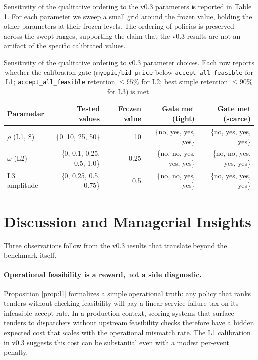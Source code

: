 \documentclass[11pt]{article}
\begin{document}
Sensitivity of the qualitative ordering to the v0.3 parameters is
reported in Table \ref{tab:sensitivity}. For each parameter we sweep a
small grid around the frozen value, holding the other parameters at
their frozen levels. The ordering of policies is preserved across the
swept ranges, supporting the claim that the v0.3 results are not an
artifact of the specific calibrated values.

\begin{table}[t]
\centering
\caption{Sensitivity of the qualitative ordering to v0.3 parameter
choices. Each row reports whether the calibration gate
(\texttt{myopic}/\texttt{bid\_price} below \texttt{accept\_all\_feasible}
for L1; \texttt{accept\_all\_feasible} retention $\leq 95\%$ for L2; best
simple retention $\leq 90\%$ for L3) is met.}
\label{tab:sensitivity}
\small
\begin{tabular}{lrrrr}
\toprule
Parameter & Tested values & Frozen value & Gate met (tight) & Gate met (scarce) \\
\midrule
$\rho$ (L1, \$) & \{0, 10, 25, 50\} & 10 & \{no, yes, yes, yes\} & \{no, yes, yes, yes\} \\
$\omega$ (L2)   & \{0, 0.1, 0.25, 0.5, 1.0\} & 0.25 & \{no, no, yes, yes, yes\} & \{no, no, yes, yes, yes\} \\
L3 amplitude    & \{0, 0.25, 0.5, 0.75\} & 0.5 & \{no, no, yes, yes\} & \{no, yes, yes, yes\} \\
\bottomrule
\end{tabular}
\end{table}

\section{Discussion and Managerial Insights}
\label{sec:discussion}

Three observations follow from the v0.3 results that translate beyond the
benchmark itself.

\paragraph{Operational feasibility is a reward, not a side diagnostic.}
Proposition \ref{prop:l1} formalizes a simple operational truth: any
policy that ranks tenders without checking feasibility will pay a linear
service-failure tax on its infeasible-accept rate. In a production
context, scoring systems that surface tenders to dispatchers without
upstream feasibility checks therefore have a hidden expected cost that
scales with the operational mismatch rate. The L1 calibration in v0.3
suggests this cost can be substantial even with a modest per-event
penalty.
\end{document}
